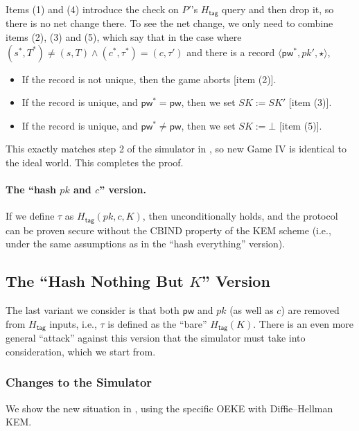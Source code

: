 \documentclass{article}
\theoremstyle{plain}
\theoremstyle{definition}
\theoremstyle{remark}
\newcommand{\Htag}{H_\mathsf{tag}}
\newcommand{\pw}{\mathsf{pw}}
\begin{document}
Items (1) and (4) introduce the check on $P'$'s $\Htag$ query and then drop it, so there is no net change there. To see the net change, we only need to combine items (2), (3) and (5), which say that in the case where $(s^*,T^*) \neq (s,T) \land (c^*,\tau^*) = (c,\tau')$ and there is a record $\langle\pw^*,pk',\star\rangle$,
\begin{itemize}
  \item If the record is not unique, then the game aborts [item (2)].
  \item If the record is unique, and $\pw^* = \pw$, then we set $SK := SK'$ [item (3)].
  \item If the record is unique, and $\pw^* \neq \pw$, then we set $SK := \bot$ [item (5)].
\end{itemize}
This exactly matches step 2 of the simulator in , so new Game IV is identical to the ideal world. This completes the proof.

\paragraph{The ``hash $pk$ and $c$'' version.}
If we define $\tau$ as $\Htag(pk,c,K)$, then  unconditionally holds, and the protocol can be proven secure without the CBIND property of the KEM scheme (i.e., under the same assumptions as in the ``hash everything'' version).

\subsection{The ``Hash Nothing But $K$'' Version}
\label{app:hash-nothing}

The last variant we consider is that both $\pw$ and $pk$ (as well as $c$) are removed from $\Htag$ inputs, i.e., $\tau$ is defined as the ``bare'' $\Htag(K)$. There is an even more general ``attack'' against this version that the simulator must take into consideration, which we start from.

\subsubsection{Changes to the Simulator}
\label{app:hash-nothing-sim}
We show the new situation in , using the specific OEKE with Diffie--Hellman KEM.
\end{document}
